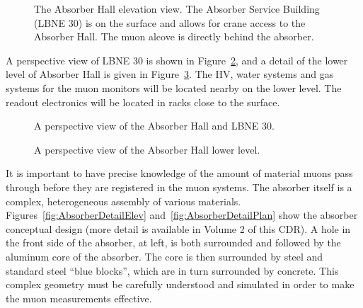 \begin{figure}[htbp]
\begin{center}
\caption[The Absorber Hall elevation view]{ The Absorber Hall elevation view. The Absorber Service Building (LBNE 30) is on the surface and allows for crane access 
to the Absorber Hall. The muon alcove is directly behind the absorber. 
}
\label{fig:AbsorberHallElevation}
\end{center}
\end{figure}


A perspective view of LBNE 30 is shown in Figure~\ref{fig:AbsorberServiceBuilding}, and a detail of the lower level of Absorber Hall
is given in Figure~\ref{fig:AbsorberFloorLevel}.  The HV, water systems and gas systems for the muon monitors will be located nearby on the lower level.
The readout electronics will be located in racks close to the surface. 

\begin{figure}[htbp]
\begin{center}
\caption[The Absorber Hall with LBNE 30]{A perspective view of the Absorber Hall and LBNE 30.}
\label{fig:AbsorberServiceBuilding}
\end{center}
\end{figure}

\begin{figure}[htbp]
\begin{center}
\caption[The lower level of the Absorber Hall]{A perspective view of the 
Absorber Hall lower level.}
\label{fig:AbsorberFloorLevel}
\end{center}
\end{figure}


It is important to have precise knowledge of the amount of material muons pass
through before they are registered in the muon systems. The absorber
itself is a complex, heterogeneous assembly of various
materials. 
Figures~\ref{fig:AbsorberDetailElev} and~\ref{fig:AbsorberDetailPlan} show the absorber conceptual design (more detail is available in Volume 2 of this CDR). A hole
in the front side of the absorber, at left, is both surrounded and followed by the
aluminum core of the absorber. The core is then surrounded by steel 
and standard steel ``blue blocks'', 
which are in turn surrounded by concrete.  This
complex geometry must be carefully understood and simulated in order
to make the muon measurements effective. 


